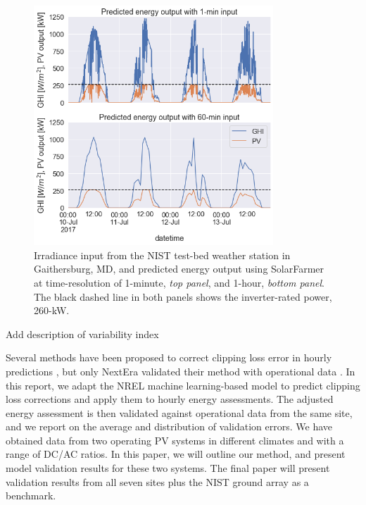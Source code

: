 \documentclass[conference]{IEEEtran}
\begin{document}
\begin{figure}[htbp]
\centerline{\includegraphics[width=9cm]{hourly_v_1-min_clipping.png}}
\caption{Irradiance input from the NIST test-bed weather station in Gaithersburg, MD, and predicted energy output using SolarFarmer at time-resolution of 1-minute, \textit{top panel}, and 1-hour, \textit{bottom panel}. The black dashed line in both panels shows the inverter-rated power, 260-kW.}
\label{fig:irradiance-and-power}
\end{figure}

Add description of variability index

Several methods have been proposed to correct clipping loss error in hourly predictions \cite{Cormode2019,Kharait,Anderson2020,Bradford}, but only NextEra validated their method with operational data \cite{Bradford}. 
In this report, we adapt the NREL machine learning-based model \cite{Anderson2020} to predict clipping loss corrections and apply them to hourly energy assessments. The adjusted energy assessment is then validated against operational data from the same site, and we report on the average and distribution of validation errors.  We have obtained data from two operating PV systems in different climates and with a range of DC/AC ratios. In this paper, we will outline our method, and present model validation results for these two systems. The final paper will present validation results from all seven sites plus the NIST ground array \cite{Boyd2017b} as a benchmark.
\end{document}
